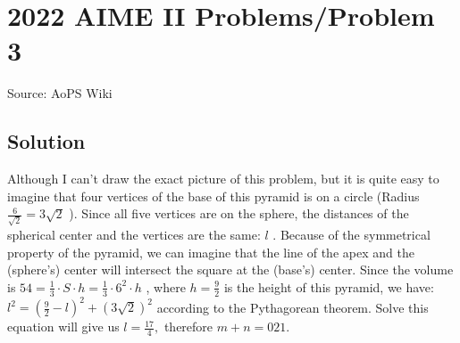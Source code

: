 \documentclass[12pt]{article}
\begin{document}
\section*{{2022 AIME II Problems/Problem 3}}
Source: AoPS Wiki

\subsection*{Solution}
Although I can't draw the exact picture of this problem, but it is quite easy to imagine that four vertices of the base of this pyramid is on a circle (Radius $\frac{6}{\sqrt{2}} = 3\sqrt{2}$ ). Since all five vertices are on the sphere, the distances of the spherical center and the vertices are the same: $l$ . Because of the symmetrical property of the pyramid,
we can imagine that the line of the apex and the (sphere's) center will intersect the square at the (base's) center. Since the volume is $54 = \frac{1}{3} \cdot S \cdot h = \frac{1}{3} \cdot 6^2 \cdot h$ , where $h=\frac{9}{2}$ is the height of this pyramid, we have: $l^2=\left(\frac{9}{2}-l\right)^2+\left(3\sqrt{2}\right)^2$ according to the Pythagorean theorem. Solve this equation will give us $l = \frac{17}{4},$ therefore $m+n=\boxed{021}.$
\end{document}
